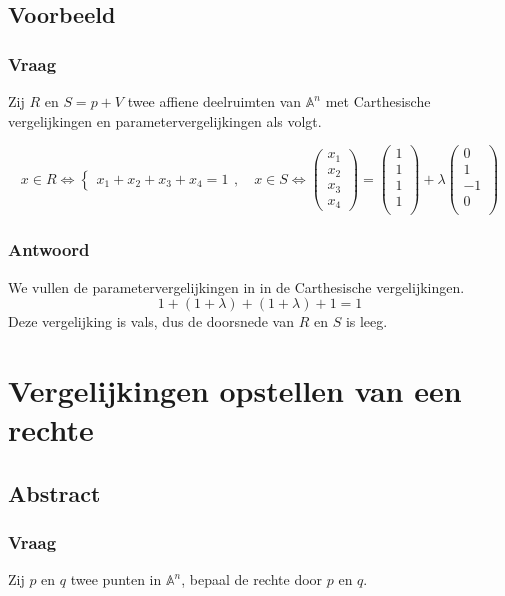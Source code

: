 \documentclass[main.tex]{subfiles}
\begin{document}
\subsection{Voorbeeld}
\subsubsection{Vraag}
\begin{center}
  Zij $R$ en $S=p+V$ twee affiene deelruimten van $\mathbb{A}^{n}$ met Carthesische vergelijkingen en parametervergelijkingen als volgt.
\end{center}
\[
x\in R \Leftrightarrow
\left\{
  \begin{array}{c}
    x_{1}+x_{2}+x_{3}+x_{4}=1
  \end{array}
\right.
,\quad
x\in S \Leftrightarrow
\begin{pmatrix}x_{1}\\x_{2}\\x_{3}\\x_{4}\end{pmatrix}
=
\begin{pmatrix}1\\1\\1\\1\\\end{pmatrix}
+\lambda
\begin{pmatrix}0\\1\\-1\\0\\\end{pmatrix}
\]

\subsubsection{Antwoord}
We vullen de parametervergelijkingen in in de Carthesische vergelijkingen.
\[ 1+(1+\lambda)+(1+\lambda) + 1 = 1 \]
Deze vergelijking is vals, dus de doorsnede van $R$ en $S$ is leeg.

\newpage
\section{Vergelijkingen opstellen van een rechte}
\subsection{Abstract}
\subsubsection{Vraag}
\begin{center}
  Zij $p$ en $q$ twee punten in $\mathbb{A}^{n}$, bepaal de rechte door $p$ en $q$.
\end{center}
\end{document}
